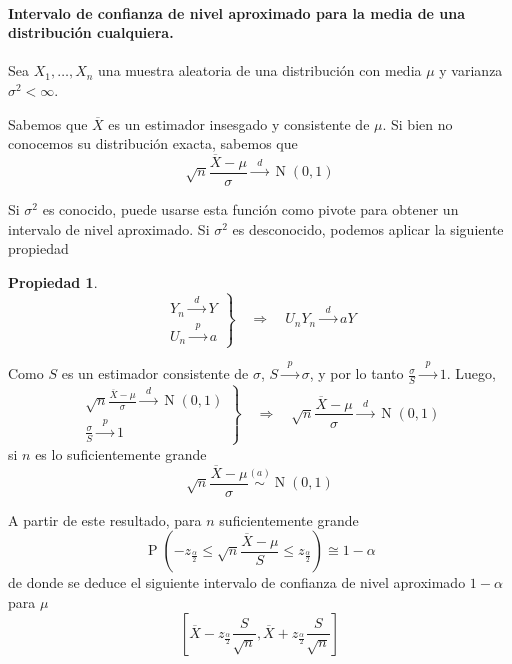 \documentclass[11pt]{article}
\theoremstyle{plain}
\theoremstyle{definition}
\newtheorem*{prop}{Propiedad}
\theoremstyle{remark}
\newcommand{\proba}{\ensuremath{\operatorname{P}}}  %
\newcommand{\dists}[1]{\ensuremath{\operatorname{#1}}}  %
\newcommand{\distt}[2]{\ensuremath{\overset{#1}{\sim} \operatorname{#2}}}  %
\newcommand{\tiende}[1]{\ensuremath{\xrightarrow{\;\; #1 \;\;}}}  %
\begin{document}
      \paragraph{Intervalo de confianza de nivel aproximado para la media de una distribución cualquiera.}

        Sea $X_1, \dots, X_n$ una muestra aleatoria de una distribución con media $\mu$ y varianza $\sigma^2 < \infty$.

        Sabemos que $\overline{X}$ es un estimador insesgado y consistente de $\mu$. Si bien no conocemos su distribución exacta, sabemos que
        \[ \sqrt{n} \frac{\overline{X} - \mu}{\sigma} \tiende{d} \dists{N}(0,1) \]

        Si $\sigma^2$ es conocido, puede usarse esta función como pivote para obtener un intervalo de nivel aproximado. Si $\sigma^2$ es desconocido, podemos aplicar la siguiente propiedad

        \begin{prop}
          \[ \left. \begin{array}{l} Y_n \tiende{d} Y \\ U_n \tiende{p} a \end{array} \right\rbrace \quad \Longrightarrow \quad U_n Y_n \tiende{d} a Y \]
        \end{prop}

        Como $S$ es un estimador consistente de $\sigma$, $S \tiende{p} \sigma$, y por lo tanto $\frac{\sigma}{S} \tiende{p} 1$. Luego,
        \[ \left. \begin{array}{l}
        \displaystyle \sqrt{n} \frac{\overline{X} - \mu}{\sigma} \tiende{d} \dists{N}(0,1) \\
        \displaystyle \frac{\sigma}{S} \tiende{p} 1
        \end{array} \right\rbrace \quad \Longrightarrow \quad \sqrt{n} \frac{\overline{X} - \mu}{\sigma} \tiende{d} \dists{N}(0,1) \]
        si $n$ es lo suficientemente grande
        \[ \sqrt{n} \frac{\overline{X} - \mu}{\sigma} \distt{(a)}{N}(0,1) \]

        A partir de este resultado, para $n$ suficientemente grande
        \[ \proba \left( -z_{\frac{\alpha}{2}} \leq \sqrt{n} \frac{\overline{X} - \mu}{S} \leq z_{\frac{\alpha}{2}} \right) \cong 1 - \alpha \]
        de donde se deduce el siguiente intervalo de confianza de nivel aproximado $1 - \alpha$ para $\mu$
        \[ \left[ \overline{X} - z_{\frac{\alpha}{2}} \frac{S}{\sqrt{n}}, \overline{X} + z_{\frac{\alpha}{2}} \frac{S}{\sqrt{n}} \right] \]
\end{document}
